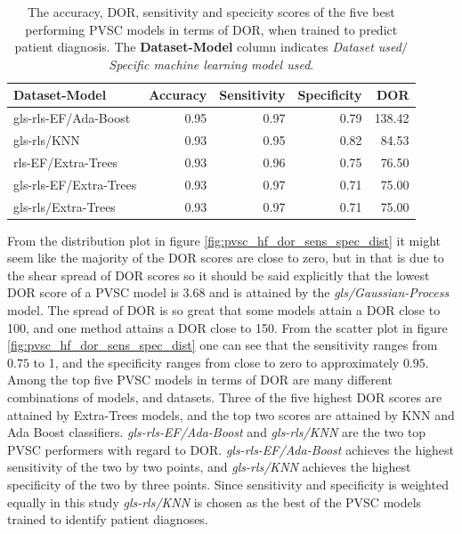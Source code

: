 \begin{table}
    \centering
    \begin{tabular}{lrrrr}
        \toprule
        Dataset-Model          &  Accuracy &  Sensitivity &  Specificity &  DOR \\
        \midrule
        gls-rls-EF/Ada-Boost   &      0.95 &         0.97 &         0.79 & 138.42 \\
        gls-rls/KNN            &      0.93 &         0.95 &         0.82 &  84.53 \\
        rls-EF/Extra-Trees     &      0.93 &         0.96 &         0.75 &  76.50 \\
        gls-rls-EF/Extra-Trees &      0.93 &         0.97 &         0.71 &  75.00 \\
        gls-rls/Extra-Trees    &      0.93 &         0.97 &         0.71 &  75.00 \\
        \bottomrule
    \end{tabular}
    \caption{The accuracy, DOR, sensitivity and specicity scores of the five best performing PVSC models in terms of DOR, when trained to predict patient diagnosis.
             The \textbf{Dataset-Model} column indicates \textit{Dataset used}$/$\textit{Specific machine learning model used}.}
    \label{tab:pvsc_hf_dor_sens_spec_dist}
\end{table}

From the distribution plot in figure \ref{fig:pvsc_hf_dor_sens_spec_dist} it might seem like the majority of the DOR scores are close to zero, but in that is due to the shear spread of DOR scores so it should be said explicitly that the lowest DOR score of a PVSC model is 3.68 and is attained by the \textit{gls/Gaussian-Process} model.
The spread of DOR is so great that some models attain a DOR close to 100, and one method attains a DOR close to 150.
From the scatter plot in figure \ref{fig:pvsc_hf_dor_sens_spec_dist} one can see that the sensitivity ranges from $0.75$ to 1, and the specificity ranges from 
close to zero to approximately $0.95$. 
Among the top five PVSC models in terms of DOR are many different combinations of models, and datasets. 
Three of the five highest DOR scores are attained by Extra-Trees models, and the top two scores are attained by KNN and Ada Boost classifiers. 
\textit{gls-rls-EF/Ada-Boost} and \textit{gls-rls/KNN} are the two top PVSC performers with regard to DOR.
\textit{gls-rls-EF/Ada-Boost} achieves the highest sensitivity of the two by two points, and \textit{gls-rls/KNN} achieves the highest specificity of the two by three points.
Since sensitivity and specificity is weighted equally in this study \textit{gls-rls/KNN} is chosen as the best of the PVSC models trained to identify patient diagnoses.

